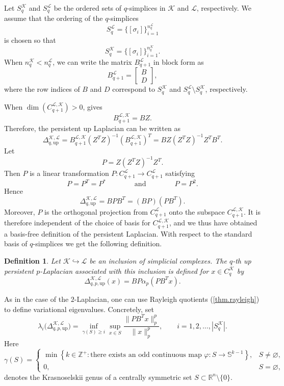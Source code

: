 \documentclass{article}
\newtheorem{definition}{Definition}[section]
\newcommand{\KK}{\mathcal{K}}
\newcommand{\LL}{\mathcal{L}}
\begin{document}
Let \(S_q^{\KK}\) and \(S_q^{\LL}\) be the ordered sets of \(q\)-simplices in \(\KK\) and \(\LL\), respectively. We assume that the ordering of the \(q\)-simplices
\[
S_q^{\LL}=\{[\sigma_i]\}_{i=1}^{n_q^\LL}
\]
is chosen so that
\[
S_q^{\KK}=\{[\sigma_i]\}_{i=1}^{n_q^\KK}.
\]
When \(n_q^\KK<n_q^\LL\), we can write the matrix \(B_{q+1}^{\LL}\) in block form as
\[
B_{q+1}^{\LL}
=
\begin{bmatrix}
B\\
D
\end{bmatrix},
\]
where the row indices of \(B\) and \(D\) correspond to \(S_q^{\KK}\) and
\(S_q^{\LL}\setminus S_q^{\KK}\), respectively.

When \(\dim(C_{q+1}^{\LL,\KK})>0\), \cite[Lemma 3.4]{pers_lap} gives
\[
B_{q+1}^{\LL,\KK}=BZ.
\]
Therefore, the persistent up Laplacian can be written as
\[
\Delta_{q,\mathrm{up}}^{\KK,\LL}
=
B_{q+1}^{\LL, \KK}(Z^TZ)^{-1}(B_{q+1}^{\LL, \KK})^T=
BZ(Z^T Z)^{-1}Z^T B^T.
\]
Let
\[
P=Z(Z^T Z)^{-1}Z^T.
\]
Then $P$ is a linear transformation $P\colon C_{q+1}^\LL\to C_{q+1}^\LL$ satisfying
\[
P=P^T= P^*\qquad \qquad  \text{and} \qquad \qquad P=P^2.
\]
Hence
\begin{equation}\label{eq:P_pers_up_lap}
\Delta_{q,\mathrm{up}}^{\KK,\LL}
=
BPB^T
=
(BP)(PB^T).
\end{equation}
Moreover, \(P\) is the orthogonal projection from \(C_{q+1}^{\LL}\) onto the subspace
\(C_{q+1}^{\LL,\KK}\). It is therefore independent of the choice of basis for
\(C_{q+1}^{\LL,\KK}\), and we thus have obtained a basis-free definition of the persistent Laplacian. With respect to the standard basis of $q$-simplices we get the following definition.

\begin{definition}\label{def:pers_lap}
Let \(\KK\hookrightarrow \LL\) be an inclusion of simplicial complexes. The
\(q\)-th up persistent \(p\)-Laplacian associated with this inclusion is
defined for \(x\in C_q^{\KK}\) by
\[
\Delta_{q,p,\mathrm{up}}^{\KK,\LL}(x)
=
BP\alpha_p(PB^T x).
\]
\end{definition}

As in the case of the \(2\)-Laplacian, one can use Rayleigh quotients (\cref{thm.rayleigh}) to
define variational eigenvalues. Concretely, set
\begin{equation}\label{eq:var_eigenval}
\lambda_i\bigl(\Delta_{q,p,\mathrm{up}}^{\KK,\LL}\bigr)
=
\inf_{\gamma(S)\geq i}
\sup_{x\in S}
\frac{\|PB^T x\|_p^p}{\|x\|_p^p},
\qquad
i=1,2,\ldots, |S_q^\KK|.
\end{equation}
Here
\[
\gamma(S)=
\begin{cases}
\min \left\{
k\in \mathbb Z^+ :
\text{there exists an odd continuous map }
\varphi:S\to \mathbb S^{k-1}
\right\}, & S\neq \varnothing,\\[2mm]
0, & S=\varnothing,
\end{cases}
\]
denotes the Krasnoselskii genus of a centrally symmetric set
\(S\subset \mathbb R^n\setminus\{0\}\).
\end{document}
